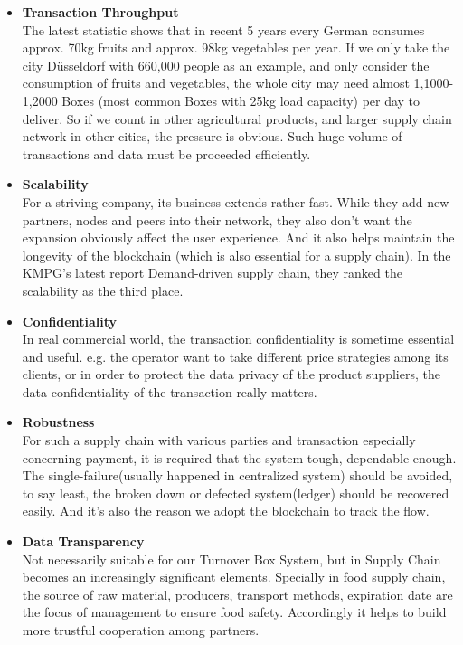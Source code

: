 \begin{itemize}
	\item \textbf{Transaction Throughput}\\
		The latest statistic shows that in recent 5 years every German consumes approx. 70kg fruits and approx. 98kg vegetables per year\cite{obst}. If we only take the city Düsseldorf with 660,000 people as an example, and only consider the consumption of fruits and vegetables, the whole city may need almost 1,1000-1,2000 Boxes (most common Boxes with 25kg load capacity) per day to deliver. So if we count in other agricultural products, and larger supply chain network in other cities, the pressure is obvious. Such huge volume of transactions and data must be proceeded efficiently.
		
	\item \textbf{Scalability}\\
		For a striving company, its business extends rather fast. While they add new partners, nodes and peers into their network, they also don't want the expansion obviously affect the user experience. And it also helps maintain the longevity of the blockchain (which is also essential for a supply chain). In the KMPG's latest report Demand-driven supply chain, they ranked the scalability as the third place.
	
	\item \textbf{Confidentiality}\\
		In real commercial world, the transaction confidentiality is sometime essential and useful. e.g. the operator want to take different price strategies among its clients, or in order to protect the data privacy of the product suppliers, the data confidentiality of the transaction really matters.
	
	\item \textbf{Robustness}\\
		For such a supply chain with various parties and transaction especially concerning payment, it is required that the system tough, dependable enough. The single-failure(usually happened in centralized system) should be avoided, to say least, the broken down or defected system(ledger) should be recovered easily. And it's also the reason we adopt the blockchain to track the flow.
		
	\item \textbf{Data Transparency}\\
		Not necessarily suitable for our Turnover Box System, but in Supply Chain becomes an increasingly significant elements. Specially in food supply chain, the source of raw material, producers, transport methods, expiration date are the focus of management to ensure food safety. Accordingly it helps to build more trustful cooperation among partners.    
\end{itemize}


